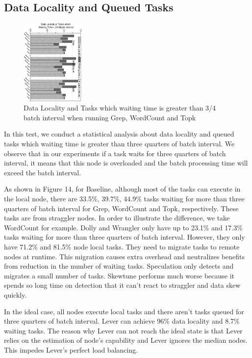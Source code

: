 \subsection{Data Locality and Queued Tasks}

  \begin{figure}[htbp]
    \centering
    \includegraphics[width=0.28\textwidth, angle=90]{FigureDLWT}
    \caption{Data Locality and Tasks which waiting time is greater than 3/4 batch interval when running Grep, WordCount and Topk}
    \label{Fig. 14:}
  \end{figure}

  In this test, we conduct a statistical analysis about data locality and queued tasks which waiting time is greater than three quarters of batch interval. We observe that in our experiments if a task waits for three quarters of batch interval, it means that this node is overloaded and the batch processing time will exceed the batch interval.

  As shown in Figure 14, for Baseline, although most of the tasks can execute in the local node, there are 33.5\%, 39.7\%, 44.9\% tasks waiting for more than three quarters of batch interval for Grep, WordCount and Topk, respectively. These tasks are from straggler nodes. In order to illustrate the difference, we take WordCount for example. Dolly and Wrangler only have up to 23.1\% and 17.3\% tasks waiting for more than three quarters of batch interval. However, they only have 71.2\% and 81.5\% node local tasks. They need to migrate tasks to remote nodes at runtime. This migration causes extra overhead and neutralizes benefits from reduction in the number of waiting tasks. Speculation only detects and migrates a small number of tasks. Skewtune performs much worse because it spends so long time on detection that it can't react to straggler and data skew quickly.

  In the ideal case, all nodes execute local tasks and there aren't tasks queued for three quarters of batch interval. Lever can achieve 96\% data locality and 8.7\% waiting tasks. The reason why Lever can not reach the ideal state is that Lever relies on the estimation of node's capability and Lever ignores the median nodes. This impedes Lever's perfect load balancing.

